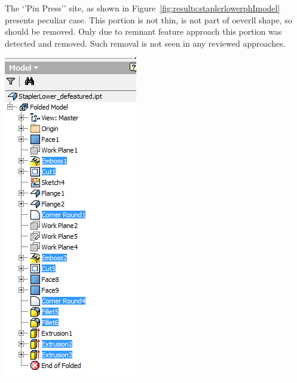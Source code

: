 \begin{minipage}{\linewidth}
\begin{minipage}[c]{0.62\linewidth}
The `'Pin Press'' site, as shown in Figure~\ref{fig:results:staplerlowerphImodel} presents peculiar case. This portion is not thin, is not part of oeverll shape, so should be removed. Only due to remnant feature approach this portion was detected and removed. Such removal is not seen in any reviewed approaches.
\end{minipage}
\quad
\begin{minipage}[c]{0.3\linewidth}
\includegraphics[width=\linewidth,valign=t]{../Common/images/StaplerLower_PhISelections_1_tree}
 \label{fig:results:staplerlowerphItree}
\end{minipage}
\end{minipage}


